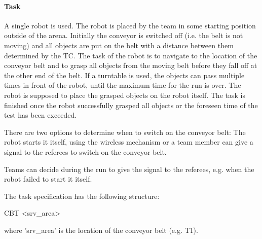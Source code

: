 \paragraph{Task}
A single robot is used. The robot is placed by the team in some starting position outside of the arena. Initially the conveyor is switched off (i.e. the belt is not moving) and all objects are put on the belt with a distance between them determined by the TC. The task of the robot is to navigate to the location of the conveyor belt and to grasp all objects from the moving belt before they fall off at the other end of the belt. If a turntable is used, the objects can pass multiple times in front of the robot, until the maximum time for the run is over. The robot is supposed to place the grasped objects on the robot itself. The task is finished once the robot successfully grasped all objects or the foreseen time of the test has been exceeded. 
\par
There are two options to determine when to switch on the conveyor belt:
The robot starts it itself, using the wireless mechanism or a team member can give a signal to the referees to switch on the conveyor belt.
\par
Teams can decide during the run to give the signal to the referees, e.g. when the robot failed to start it itself. 
\par
The task specification has the following structure:
\par
\begin{center}
CBT \textless srv\_area\textgreater
\end{center}
\par
where 'srv\_area' is the location of the conveyor belt (e.g. T1).



%



